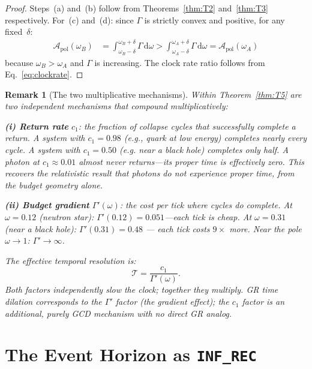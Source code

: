 \documentclass[
  aps,
  prd,
  twocolumn,
  superscriptaddress,
  nofootinbib,
  floatfix
]{revtex4-2}
\newtheorem{remark}{Remark}
\newcommand{\Gam}{\Gamma}
\newcommand{\dd}{\mathrm{d}}
\newcommand{\Tres}{\mathcal{T}}
\newcommand{\Apol}{\mathcal{A}_{\mathrm{pol}}}         %
\begin{document}
\begin{proof}
Steps~(a) and~(b) follow from Theorems~\ref{thm:T2}
and~\ref{thm:T3} respectively.  For~(c) and~(d): since
$\Gam$ is strictly convex and positive, for any
fixed~$\delta$:
\begin{align}
  \Apol(\omega_B)
  &= \int_{\omega_B - \delta}^{\omega_B + \delta}\Gam\,\dd\omega
   > \int_{\omega_A - \delta}^{\omega_A + \delta}\Gam\,\dd\omega
   = \Apol(\omega_A)
\end{align}
because $\omega_B > \omega_A$ and $\Gam$ is increasing.
The clock rate ratio follows from Eq.~\eqref{eq:clockrate}.
\end{proof}

\begin{remark}[The two multiplicative mechanisms]
\label{rem:twomech}
Within Theorem~\ref{thm:T5} are two independent mechanisms
that compound multiplicatively:

\textbf{(i) Return rate} $c_1$: the fraction of collapse
cycles that successfully complete a return.  A system with
$c_1 = 0.98$ (e.g., quark at low energy) completes nearly
every cycle.  A system with $c_1 = 0.50$ (e.g. near a
black hole) completes only half.  A photon at $c_1 \approx
0.01$ almost never returns---its proper time is effectively
zero.  This recovers the relativistic result that photons
do not experience proper time, from the budget geometry
alone.

\textbf{(ii) Budget gradient} $\Gam'(\omega)$: the cost per
tick where cycles do complete.  At $\omega = 0.12$ (neutron
star): $\Gam'(0.12) = 0.051$---each tick is cheap.  At
$\omega = 0.31$ (near a black hole): $\Gam'(0.31) = 0.48$
--- each tick costs $9\times$ more.  Near the pole
$\omega \to 1$: $\Gam' \to \infty$.

The effective temporal resolution is:
\begin{equation}
  \Tres = \frac{c_1}{\Gam'(\omega)}.
  \label{eq:resolution}
\end{equation}
Both factors independently slow the clock; together they
multiply.  GR time dilation corresponds to the $\Gam'$
factor (the gradient effect); the $c_1$ factor is an
additional, purely GCD mechanism with no direct GR analog.
\end{remark}

\section{The Event Horizon as \texttt{INF\_REC}}
\label{sec:event}
\end{document}
